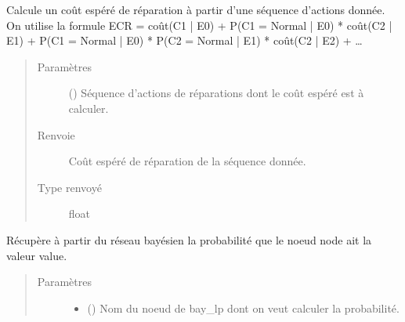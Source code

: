 \documentclass[letterpaper,10pt,french]{sphinxmanual}
\begin{document}
\begin{fulllineitems}
\begin{fulllineitems}
\label{\detokenize{index:DecisionTheoreticTroubleshooting.TroubleShootingProblem.expected_cost_of_repair_seq_of_actions}}
Calcule un coût espéré de réparation à partir d’une séquence d’actions
donnée. On utilise la formule
ECR = coût(C1 | E0)
+ P(C1 = Normal | E0) * coût(C2 | E1)
+ P(C1 = Normal | E0) * P(C2 = Normal | E1) * coût(C2 | E2)
+ …
\begin{quote}\begin{description}
\item[{Paramètres}] \leavevmode
{} (\sphinxstyleliteralemphasis{\sphinxupquote{(}}\sphinxstyleliteralemphasis{\sphinxupquote{)}}) \textendash{} Séquence d’actions de réparations dont le coût espéré est à
calculer.

\item[{Renvoie}] \leavevmode
{} \textendash{} Coût espéré de réparation de la séquence donnée.

\item[{Type renvoyé}] \leavevmode
float

\end{description}\end{quote}

\end{fulllineitems}


\begin{fulllineitems}
\label{\detokenize{index:DecisionTheoreticTroubleshooting.TroubleShootingProblem.get_proba}}
Récupère à partir du réseau bayésien la probabilité que le noeud node
ait la valeur value.
\begin{quote}\begin{description}
\item[{Paramètres}] \leavevmode\begin{itemize}
\item {} 
 () \textendash{} Nom du noeud de bay\_lp dont on veut calculer la probabilité.


\end{itemize}
\end{description}
\end{quote}
\end{fulllineitems}
\end{fulllineitems}
\end{document}
